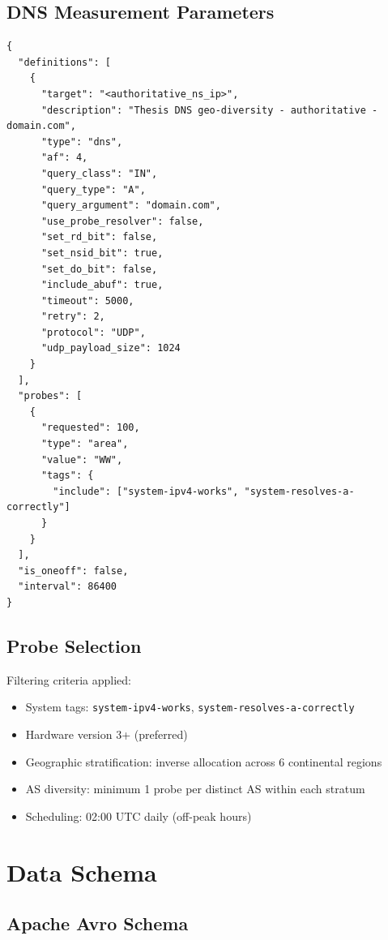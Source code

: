 \documentclass[a4paper,11pt]{book}
\begin{document}
\section{DNS Measurement Parameters}

\begin{lstlisting}[style=json,caption=JSON configuration of a RIPE Atlas DNS measurement]
{
  "definitions": [
    {
      "target": "<authoritative_ns_ip>",
      "description": "Thesis DNS geo-diversity - authoritative - domain.com",
      "type": "dns",
      "af": 4,
      "query_class": "IN",
      "query_type": "A",
      "query_argument": "domain.com",
      "use_probe_resolver": false,
      "set_rd_bit": false,
      "set_nsid_bit": true,
      "set_do_bit": false,
      "include_abuf": true,
      "timeout": 5000,
      "retry": 2,
      "protocol": "UDP",
      "udp_payload_size": 1024
    }
  ],
  "probes": [
    {
      "requested": 100,
      "type": "area",
      "value": "WW",
      "tags": {
        "include": ["system-ipv4-works", "system-resolves-a-correctly"]
      }
    }
  ],
  "is_oneoff": false,
  "interval": 86400
}
\end{lstlisting}

\section{Probe Selection}

Filtering criteria applied:
\begin{itemize}
    \item System tags: \texttt{system-ipv4-works}, \texttt{system-resolves-a-correctly}
    \item Hardware version 3+ (preferred)
    \item Geographic stratification: inverse allocation across 6 continental regions
    \item AS diversity: minimum 1 probe per distinct AS within each stratum
    \item Scheduling: 02:00 UTC daily (off-peak hours)
\end{itemize}

\chapter{Data Schema}

\section{Apache Avro Schema}
\end{document}
